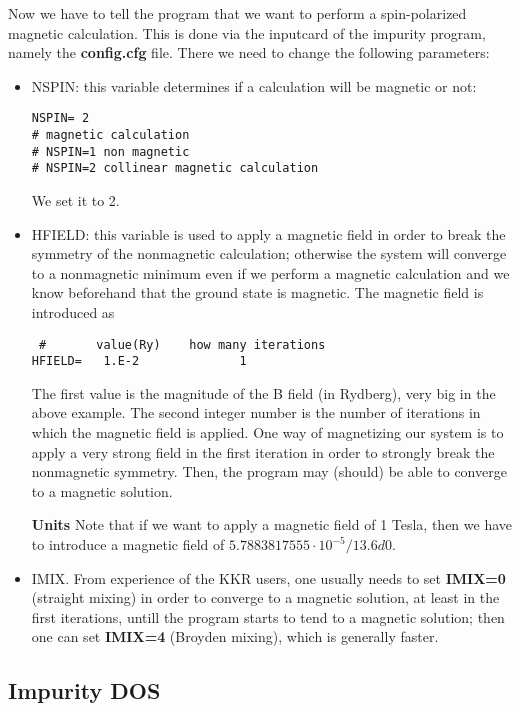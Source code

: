 \documentclass[11pt,fleqn]{book} %
\begin{document}
Now we have to tell the program that we want to perform a spin-polarized magnetic calculation.
This is done via the inputcard of the impurity program, namely the
\textbf{config.cfg} file.
There we need to change the following parameters:
\begin{itemize}
\item NSPIN: this variable determines if a calculation will be magnetic or not:
\begin{VBox}
\begin{verbatim}
NSPIN= 2
# magnetic calculation
# NSPIN=1 non magnetic
# NSPIN=2 collinear magnetic calculation
\end{verbatim}
\end{VBox}
We set it to 2.

 \item HFIELD: this variable is used to apply a magnetic field in order to break the
symmetry of the nonmagnetic calculation; otherwise the system will converge to a nonmagnetic
minimum even if we perform a magnetic calculation and we know beforehand that the ground state
is magnetic. The magnetic field is introduced as
\begin{VBox}
\begin{verbatim}
 #       value(Ry)    how many iterations
HFIELD=   1.E-2              1
\end{verbatim}
\end{VBox}
The first value is the magnitude of the B field (in Rydberg), very big in the above example.
The second integer number is the number of iterations in which the magnetic field is applied.
One way of magnetizing our system is to apply a very strong field in the first iteration
in order to strongly break the nonmagnetic symmetry. Then, the program may (should)
be able to converge to a magnetic solution.

\textbf{Units} Note that if we want to apply a magnetic field of 1 Tesla, then we
have to introduce a magnetic field of $5.7883817555\cdot10^{-5}/13.6d0$.

\item IMIX. From experience of the KKR users, one usually needs to set \textbf{IMIX=0} (straight mixing)
in order to converge to a magnetic solution, at least in the first iterations, untill the program
starts to tend to a magnetic solution; then one can set \textbf{IMIX=4} (Broyden mixing),
which is generally faster.

\end{itemize}

\subsection{Impurity DOS}
\end{document}
